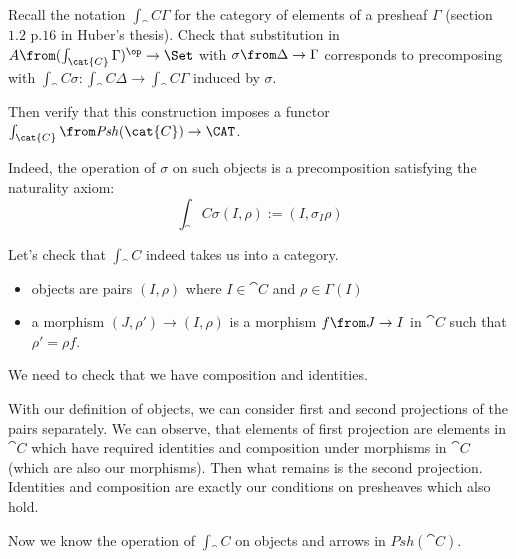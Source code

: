 \begin{exercise}
  Recall the notation $\int_\cat{C}\Gamma$ for the category of elements of a
  presheaf $\Gamma$ (section $1.2$ p.$16$ in Huber's thesis).  Check that
  substitution in $A\from (\int_\cat{C}\Gamma)^\op \to \Set$ with $\sigma \from
  \Delta \to \Gamma$ corresponds to precomposing with $\int_\cat{C} \sigma :
  \int_\cat{C} \Delta \to \int_\cat{C} \Gamma$ induced by $\sigma$.

  Then verify that this construction imposes a functor $\int_\cat{C} \from
  \mathit{Psh}(\cat{C}) \to \CAT$.
\end{exercise}
\begin{answer}
  Indeed, the operation of $\sigma$ on such objects is a precomposition
  satisfying the naturality axiom:
  \[
    \int_\cat{C}\sigma(I, \rho) := (I, \sigma_I \rho)
  \]

  Let's check that $\int_\cat{C}$ indeed takes us into a category.
  \begin{itemize}
    \item objects are pairs $(I, \rho)$ where $I \in \cat{C}$ and $\rho \in \Gamma(I)$
    \item a morphism $(J, \rho') \to (I, \rho)$ is a morphism $f \from J \to I$
      in $\cat{C}$ such that $\rho' = \rho f$.
  \end{itemize}
  We need to check that we have composition and identities.

  With our definition of objects, we can consider first and second projections
  of the pairs separately. We can observe, that elements of first projection
  are elements in $\cat{C}$ which have required identities and composition
  under morphisms in $\cat{C}$ (which are also our morphisms). Then what
  remains is the second projection. Identities and composition are exactly our
  conditions on presheaves which also hold.

  Now we know the operation of $\int_\cat{C}$ on objects and arrows in
  $Psh(\cat{C})$.
\end{answer}

